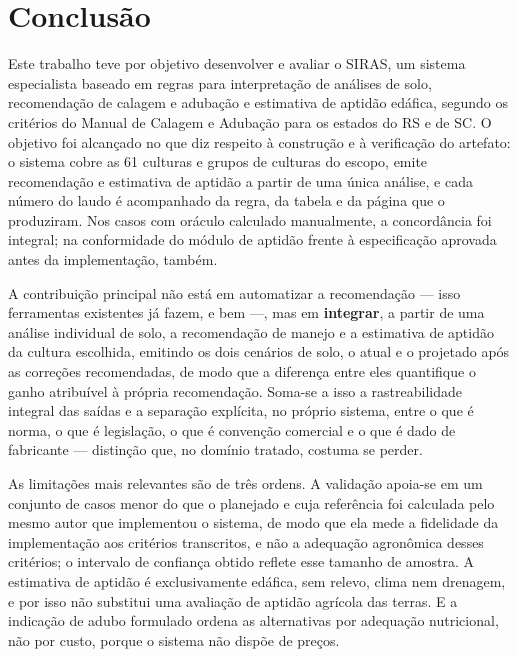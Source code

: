 %

\chapter{Conclusão}\label{chap:conclusao}

Este trabalho teve por objetivo desenvolver e avaliar o SIRAS, um sistema especialista
baseado em regras para interpretação de análises de solo, recomendação de calagem e
adubação e estimativa de aptidão edáfica, segundo os critérios do Manual de Calagem e
Adubação para os estados do RS e de SC. O objetivo foi alcançado no que diz respeito à
construção e à verificação do artefato: o sistema cobre as 61 culturas e grupos de
culturas do escopo, emite recomendação e estimativa de aptidão a partir de uma única
análise, e cada número do laudo é acompanhado da regra, da tabela e da página que o
produziram. Nos casos com oráculo calculado manualmente, a concordância foi integral; na
conformidade do módulo de aptidão frente à especificação aprovada antes da
implementação, também.

A contribuição principal não está em automatizar a recomendação --- isso ferramentas
existentes já fazem, e bem ---, mas em \textbf{integrar}, a partir de uma análise
individual de solo, a recomendação de manejo e a estimativa de aptidão da cultura
escolhida, emitindo os dois cenários de solo, o atual e o projetado após as correções
recomendadas, de modo que a diferença entre eles quantifique o ganho atribuível à
própria recomendação. Soma-se a isso a rastreabilidade integral das saídas e a separação
explícita, no próprio sistema, entre o que é norma, o que é legislação, o que é convenção
comercial e o que é dado de fabricante --- distinção que, no domínio tratado, costuma se
perder.


As limitações mais relevantes são de três ordens. A validação apoia-se em um conjunto de
casos menor do que o planejado e cuja referência foi calculada pelo mesmo autor que
implementou o sistema, de modo que ela mede a fidelidade da implementação aos critérios
transcritos, e não a adequação agronômica desses critérios; o intervalo de confiança
obtido reflete esse tamanho de amostra. A estimativa de aptidão é exclusivamente
edáfica, sem relevo, clima nem drenagem, e por isso não substitui uma avaliação de
aptidão agrícola das terras. E a indicação de adubo formulado ordena as alternativas por
adequação nutricional, não por custo, porque o sistema não dispõe de preços.

